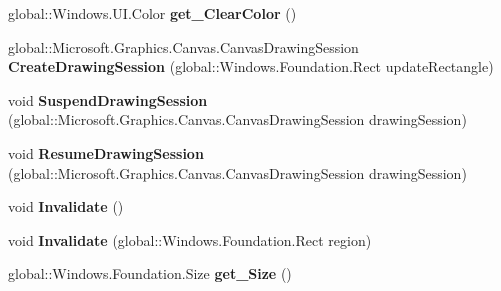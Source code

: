 \begin{DoxyCompactItemize}
global\+::\+Windows.\+U\+I.\+Color {\bfseries get\+\_\+\+Clear\+Color} ()
\item 
\mbox{\label{interface_microsoft_1_1_graphics_1_1_canvas_1_1_u_i_1_1_xaml_1_1_i_canvas_virtual_control_a0554619052150d743418f63c5cef0641}} 
global\+::\+Microsoft.\+Graphics.\+Canvas.\+Canvas\+Drawing\+Session {\bfseries Create\+Drawing\+Session} (global\+::\+Windows.\+Foundation.\+Rect update\+Rectangle)
\item 
\mbox{\label{interface_microsoft_1_1_graphics_1_1_canvas_1_1_u_i_1_1_xaml_1_1_i_canvas_virtual_control_a863b7d9556ff253f2f17ac57251ccd59}} 
void {\bfseries Suspend\+Drawing\+Session} (global\+::\+Microsoft.\+Graphics.\+Canvas.\+Canvas\+Drawing\+Session drawing\+Session)
\item 
\mbox{\label{interface_microsoft_1_1_graphics_1_1_canvas_1_1_u_i_1_1_xaml_1_1_i_canvas_virtual_control_a7e6d0d2eb3d02dc319be796419d0cfe9}} 
void {\bfseries Resume\+Drawing\+Session} (global\+::\+Microsoft.\+Graphics.\+Canvas.\+Canvas\+Drawing\+Session drawing\+Session)
\item 
\mbox{\label{interface_microsoft_1_1_graphics_1_1_canvas_1_1_u_i_1_1_xaml_1_1_i_canvas_virtual_control_a1be93b3a5d0e3dcaf003f823744a742a}} 
void {\bfseries Invalidate} ()
\item 
\mbox{\label{interface_microsoft_1_1_graphics_1_1_canvas_1_1_u_i_1_1_xaml_1_1_i_canvas_virtual_control_a62871b6e73475af85360a54cae8c5b8c}} 
void {\bfseries Invalidate} (global\+::\+Windows.\+Foundation.\+Rect region)
\item 
\mbox{\label{interface_microsoft_1_1_graphics_1_1_canvas_1_1_u_i_1_1_xaml_1_1_i_canvas_virtual_control_a492d1764aec8156722e9f3a77be1e6e4}} 
global\+::\+Windows.\+Foundation.\+Size {\bfseries get\+\_\+\+Size} ()

\end{DoxyCompactItemize}
